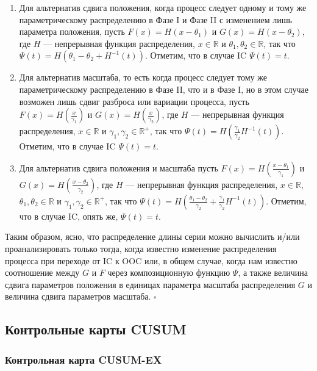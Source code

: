 \begin{enumerate}
	\item Для альтернатив сдвига положения, когда процесс следует одному и тому же параметрическому распределению в Фазе I и Фазе II с изменением лишь параметра положения, пусть \(F(x) = H(x - \theta_1)\) и \(G(x) = H(x - \theta_2)\), где \(H\) --- непрерывная функция распределения, \(x \in \mathbb{R}\) и \(\theta_1, \theta_2 \in \mathbb{R}\), так что \(\Psi(t) = H\left( \theta_1 - \theta_2 + H^{-1}(t) \right)\). Отметим, что в случае IC \(\Psi(t) = t\).
	\item Для альтернатив масштаба, то есть когда процесс следует тому же параметрическому распределению в Фазе II, что и в Фазе I, но в этом случае возможен лишь сдвиг разброса или вариации процесса, пусть \(F(x) = H\left( \frac{x}{\gamma_1} \right)\) и \(G(x) = H\left( \frac{x}{\gamma_2} \right)\), где \(H\) --- непрерывная функция распределения, \(x \in \mathbb{R}\) и \(\gamma_1, \gamma_2 \in \mathbb{R}^+\), так что \(\Psi(t) = H\left( \frac{\gamma_1}{\gamma_2}H^{-1}(t) \right)\). Отметим, что в случае IC \(\Psi(t) = t\).
	\item Для альтернатив сдвига положения и масштаба пусть \(F(x) = H\left( \frac{x - \theta_1}{\gamma_1} \right)\) и \(G(x) = H\left( \frac{x - \theta_2}{\gamma_2} \right)\), где \(H\) --- непрерывная функция распределения, \(x \in \mathbb{R}\), \(\theta_1, \theta_2 \in \mathbb{R}\) и \(\gamma_1, \gamma_2 \in \mathbb{R}^+\), так что \(\Psi(t) = H\left( \frac{\theta_1 - \theta_2}{\gamma_2} + \frac{\gamma_1}{\gamma_2}H^{-1}(t) \right)\). Отметим, что в случае IC, опять же, \(\Psi(t) = t\).
\end{enumerate}

Таким образом, ясно, что распределение длины серии можно вычислить и/или проанализировать только тогда, когда известно изменение распределения процесса при переходе от IC к OOC или, в общем случае, когда нам известно соотношение между \(G\) и \(F\) через композиционную функцию \(\Psi\), а также величина сдвига параметров положения в единицах параметра масштаба распределения \(G\) и величина сдвига параметров масштаба. \(\square\)

\subsection{Контрольные карты CUSUM}
\subsubsection{Контрольная карта CUSUM-EX}


